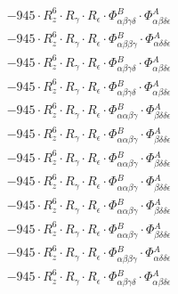 \documentclass{article}
\begin{document}
\begin{subequations}
\begin{gather}
\begin{array}{c}
 \\[0.2em] 		 - 945 \cdot R_{z}^{6} \cdot R_{\gamma{}} \cdot R_{\epsilon{}} \cdot \Phi{}^{B}_{\alpha{}\beta{}\gamma{}\delta{}} \cdot \Phi{}^{A}_{\alpha{}\beta{}\delta{}\epsilon{}} 
 \\[0.2em] 		 - 945 \cdot R_{z}^{6} \cdot R_{\gamma{}} \cdot R_{\epsilon{}} \cdot \Phi{}^{B}_{\alpha{}\beta{}\beta{}\gamma{}} \cdot \Phi{}^{A}_{\alpha{}\delta{}\delta{}\epsilon{}} 
 \\[0.2em] 		 - 945 \cdot R_{z}^{6} \cdot R_{\gamma{}} \cdot R_{\epsilon{}} \cdot \Phi{}^{B}_{\alpha{}\beta{}\gamma{}\delta{}} \cdot \Phi{}^{A}_{\alpha{}\beta{}\delta{}\epsilon{}} 
 \\[0.2em] 		 - 945 \cdot R_{z}^{6} \cdot R_{\gamma{}} \cdot R_{\epsilon{}} \cdot \Phi{}^{B}_{\alpha{}\beta{}\gamma{}\delta{}} \cdot \Phi{}^{A}_{\alpha{}\beta{}\delta{}\epsilon{}} 
 \\[0.2em] 		 - 945 \cdot R_{z}^{6} \cdot R_{\gamma{}} \cdot R_{\epsilon{}} \cdot \Phi{}^{B}_{\alpha{}\alpha{}\beta{}\gamma{}} \cdot \Phi{}^{A}_{\beta{}\delta{}\delta{}\epsilon{}} 
 \\[0.2em] 		 - 945 \cdot R_{z}^{6} \cdot R_{\gamma{}} \cdot R_{\epsilon{}} \cdot \Phi{}^{B}_{\alpha{}\alpha{}\beta{}\gamma{}} \cdot \Phi{}^{A}_{\beta{}\delta{}\delta{}\epsilon{}} 
 \\[0.2em] 		 - 945 \cdot R_{z}^{6} \cdot R_{\gamma{}} \cdot R_{\epsilon{}} \cdot \Phi{}^{B}_{\alpha{}\alpha{}\beta{}\gamma{}} \cdot \Phi{}^{A}_{\beta{}\delta{}\delta{}\epsilon{}} 
 \\[0.2em] 		 - 945 \cdot R_{z}^{6} \cdot R_{\gamma{}} \cdot R_{\epsilon{}} \cdot \Phi{}^{B}_{\alpha{}\alpha{}\beta{}\gamma{}} \cdot \Phi{}^{A}_{\beta{}\delta{}\delta{}\epsilon{}} 
 \\[0.2em] 		 - 945 \cdot R_{z}^{6} \cdot R_{\gamma{}} \cdot R_{\epsilon{}} \cdot \Phi{}^{B}_{\alpha{}\alpha{}\beta{}\gamma{}} \cdot \Phi{}^{A}_{\beta{}\delta{}\delta{}\epsilon{}} 
 \\[0.2em] 		 - 945 \cdot R_{z}^{6} \cdot R_{\gamma{}} \cdot R_{\epsilon{}} \cdot \Phi{}^{B}_{\alpha{}\alpha{}\beta{}\gamma{}} \cdot \Phi{}^{A}_{\beta{}\delta{}\delta{}\epsilon{}} 
 \\[0.2em] 		 - 945 \cdot R_{z}^{6} \cdot R_{\gamma{}} \cdot R_{\epsilon{}} \cdot \Phi{}^{B}_{\alpha{}\beta{}\beta{}\gamma{}} \cdot \Phi{}^{A}_{\alpha{}\delta{}\delta{}\epsilon{}} 
 \\[0.2em] 		 - 945 \cdot R_{z}^{6} \cdot R_{\gamma{}} \cdot R_{\epsilon{}} \cdot \Phi{}^{B}_{\alpha{}\beta{}\gamma{}\delta{}} \cdot \Phi{}^{A}_{\alpha{}\beta{}\delta{}\epsilon{}} 

\end{array}
\end{gather}
\end{subequations}
\end{document}
